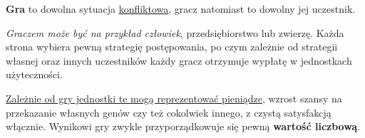 \begin{flushleft}
\textbf{Gra} to dowolna sytuacja \underline{konfliktowa}, gracz natomiast to dowolny jej uczestnik. 

\vspace{1cm}
\emph{Graczem może być na przykład człowiek}, przedsiębiorstwo lub zwierzę. Każda strona wybiera pewną strategię postępowania, po czym zależnie od strategii własnej oraz innych uczestników każdy gracz otrzymuje wypłatę w jednostkach użyteczności. 

\vspace{1cm}
\underline {Zależnie od gry jednostki te mogą reprezentować pieniądze}, wzrost szansy na przekazanie własnych genów czy też cokolwiek innego, z czystą satysfakcją włącznie. Wynikowi gry zwykle przyporządkowuje się pewną \textbf{wartość liczbową}.
\end{flushleft}
